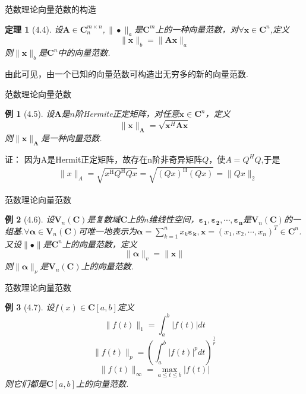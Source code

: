 \documentclass{sintefbeamer}[dark]
\newtheorem*{例}{例}
\newtheorem*{定理}{定理}
\begin{document}
	\begin{frame}{范数理论}{向量范数的构造}
		\begin{定理}[4.4]
		设$\mathbf{A}\in\mathbf{C}_{n}^{m\times n}$,$\,\|\bullet\|_{a} $是$\mathbf{C}^{m}$上的一种向量范数，对$\forall\bm{x}\in\mathbf{C}^{n}$,定义
		$$
		\|\bm{x}\|_{b}=\|\bm{A}\bm{x}\|_{a}
		$$
		\linebreak
		则$\|\bm{x}\|_{b}$是$\mathbf{C}^{n}$中的向量范数.
		\end{定理}
	\pause
	由此可见，由一个已知的向量范数可构造出无穷多的新的向量范数.
	\end{frame}

\begin{frame}{范数理论}{向量范数}
	\begin{例}[4.5]
		设$\bm{A}$是$n$阶Hermite正定矩阵，对任意$\bm{x}\in\mathbf{C}^{n}$，定义
		$$
		\|\bm{x}\|_{\bm{A}}=\sqrt{\bm{x}^{H}\bm{A}\bm{x}}
		$$
		\linebreak
		则$\|\bm{x}\|_{\bm{A}}$是一种向量范数.
		\end{例}
	\pause
	证： 因为A是Hermit正定矩阵，故存在n阶非奇异矩阵$Q$，使$A=Q^{H}Q$,于是
	\begin{equation*}
	    \begin{aligned}
		&\parallel x\parallel_A=\sqrt{x^{\mathrm{H}}Q^{\mathrm{H}}Qx}=\sqrt{(Qx)^{\mathrm{H}}(Qx)}=\parallel Qx\parallel_2
		\end{aligned}
	\end{equation*}
	\end{frame}
		
	\begin{frame}{范数理论}{向量范数}
	\begin{例}[4.6]
		设$\bm{V}_{n}(\mathbf{C})$是复数域$\mathbf{C}$上的$n$维线性空间，$\bm{\varepsilon _{1}},\bm{\varepsilon _{2}},\cdots,\bm{\varepsilon _{n}}$是$\bm{V}_{n}(\mathbf{C})$的一组基.$\forall\bm{\alpha} \in\bm{V}_{n}(\mathbf{C})$可唯一地表示为$\bm{\alpha} =\sum_{k=1}^{n} x_{k}\bm{\varepsilon _{k}},\bm{x}=(x_{1}, x_{2},\cdots,x_{n})^{T}\in\mathbf{C}^{n}$.又设$\|\bullet\|$是$\mathbf{C}^{n}$上的向量范数，定义
		$$
		\|\bm{\alpha}\|_{v}=\|\bm{x}\|
		$$
		\linebreak
		则$\|\bm{\alpha}\|_{\nu}$是$\bm{V}_{n}(\mathbf{C})$上的向量范数.
		\end{例}
\end{frame}

\begin{frame}{范数理论}{向量范数}
	\begin{例}[4.7]
		设$f(x)\in\mathbf{C}[a,b]$定义
		$$
		\|f(t)\|_{1}=\int_{a}^{b}|f(t)|dt
		$$
		$$
		\|f(t)\|_{p}=(\int_{a}^{b}|f(t)|^{p}dt)^{\frac{1}{p} }
		$$
		$$
		\|f(t)\|_{\infty}=\max_{a\le t\le b}|f(t)| 
		$$
		\linebreak
		则它们都是$\mathbf{C}[a,b]$上的向量范数.
		\end{例}
	\end{frame}
		
\end{document}
